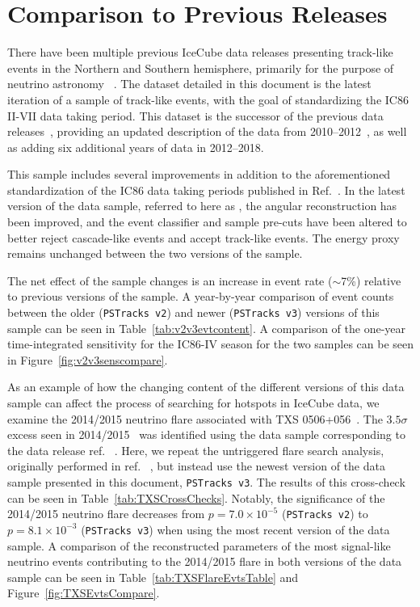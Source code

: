 \documentclass[aps,10pt,prd,twocolumn,floats,letterpaper,showpacs,nofootinbib,bibnotes,notitlepage,superscriptaddress,floatfix]{revtex4-1}
\newcommand{\MA}[1]{{\color{black}#1}}
\begin{document}
\section{Comparison to Previous Releases}\label{secIV}

There have been multiple previous IceCube data releases presenting track-like events in the Northern and Southern hemisphere, primarily for the purpose of neutrino astronomy ~\cite{Abbasi:2010rd,Aartsen:2013uuv,IceCube:2018,IceCube:2019,IceCube:TXS2018}. The dataset detailed in this document is the latest iteration of a sample of track-like events, with the goal of standardizing the IC86 II-VII data taking period. This dataset is the successor of the previous data releases~\cite{IC40data,IC59data,IceCube:2018}, providing an updated description of the data from 2010--2012~\cite{IceCube:2018}, as well as adding six additional years of data in 2012--2018. 

This sample includes several improvements in addition to the aforementioned standardization of the IC86 data taking periods published in Ref.~\cite{IceCube:2018}. In the latest version of the data sample, referred to here as  \MA{{\tt PSTracks v3}}, the angular reconstruction has been improved, and the event classifier and sample pre-cuts have been altered to better reject cascade-like events and accept track-like events. The energy proxy remains unchanged between the two versions of the sample.

The net effect of the sample changes is an increase in event rate ($\sim$7\%) relative to previous versions of the sample. A year-by-year comparison of event counts between the older \MA{({\tt PSTracks v2})} and newer \MA{({\tt PSTracks v3})} versions of this sample can be seen in Table~\ref{tab:v2v3evtcontent}. A comparison of the one-year time-integrated sensitivity for the IC86-IV season for the two samples can be seen in Figure~\ref{fig:v2v3senscompare}.

As an example of how the changing content of the different versions of this data sample can affect the process of searching for hotspots in IceCube data, we examine the 2014/2015 neutrino flare associated with TXS 0506+056~\cite{IceCube:2018cha}. The $3.5 \sigma$ excess seen in 2014/2015~\cite{IceCube:2018cha} was identified using the data sample corresponding to the data release ref. ~\cite{IceCube:2019}. Here, we repeat the untriggered flare search analysis, originally performed in ref. ~\cite{IceCube:2018cha}, but instead use the newest version of the data sample presented in this document, {\tt PSTracks v3}. The results of this cross-check can be seen in Table~\ref{tab:TXSCrossChecks}. Notably, the significance of the 2014/2015 neutrino flare decreases from $p=7.0 \times 10^{-5}$ ({\tt PSTracks v2}) to $p=8.1 \times 10^{-3}$ ({\tt PSTracks v3}) when using the most recent version of the data sample. A comparison of the reconstructed parameters of the most signal-like neutrino events contributing to the 2014/2015 flare in both versions of the data sample can be seen in Table~\ref{tab:TXSFlareEvtsTable} and Figure~\ref{fig:TXSEvtsCompare}.
\end{document}
